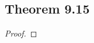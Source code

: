 \documentclass[../../main.tex]{subfiles}
\begin{document}
\subsection{Theorem 9.15}
\begin{wts}

\end{wts}
\begin{proof}

\end{proof}
\end{document}

